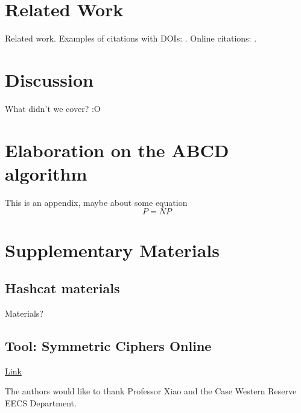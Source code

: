 \documentclass[acmlarge]{acmart}
\begin{document}
\section{Related Work}\label{sec:relatedwork}

Related work. Examples of citations with DOIs: \cite{2004:ITE:1009386.1010128, Kirschmer:2010:AEI:1958016.1958018}. Online citations: \cite{TUGInstmem, Thornburg01, CTANacmart}.

\section{Discussion}\label{sec:discussion}

What didn't we cover? :O

\appendix
\section{Elaboration on the ABCD algorithm}

This is an appendix, maybe about some equation
\begin{displaymath}
P=NP
\end{displaymath}

\section{Supplementary Materials}

\subsection{Hashcat materials}

Materials?

\subsection{Tool: Symmetric Ciphers Online }

\href{http://symmetric-ciphers.online-domain-tools.com/}{Link}

\begin{acks}

The authors would like to thank Professor Xiao and the Case Western Reserve EECS Department.

\end{acks}



\end{document}
